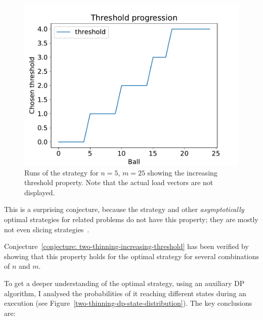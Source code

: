\begin{figure}
\begin{minipage}[t]{.32\linewidth}
  \includegraphics[scale=0.36]{Chapter4/Figs/dp_increasing_threshold_3.pdf}
\end{minipage}
\caption{Runs of the \DP strategy for $n=5$, $m=25$ showing the increasing threshold property. Note that the actual load vectors are not displayed.}
\label{dp-increasing-threshold}
\end{figure}


This is a surprising conjecture, because the \Threshold strategy and other \textit{asymptotically} optimal strategies for related problems do not have this property; they are mostly not even slicing strategies~\cite{feldheim2021longtermthinning}.


\begin{remark}
Conjecture~\ref{conjecture: two-thinning-increasing-threshold} has been verified by showing that this property holds for the optimal \DP strategy for several combinations of $n$ and $m$. 
\end{remark}


To get a deeper understanding of the optimal \DP strategy, using an auxiliary DP algorithm, I analysed the probabilities of it reaching different states during an execution (see Figure~\ref{two-thinning-dp-state-distribution}). The key conclusions are:

